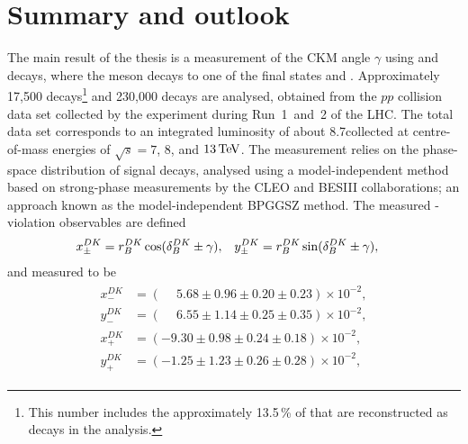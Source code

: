 

\chapter{Summary and outlook}
\label{ch:6-conclusion}

The main result of the thesis is a measurement of the CKM angle $\gamma$ using \BtoDK and \BtoDpi decays, where the \D meson decays to one of the final states \Kspipi and \KsKK. Approximately 17,500 \BtoDK decays\footnote{This number includes the approximately 13.5\,\% of \BtoDK that are reconstructed as \BtoDpi decays in the analysis.} and 230,000 \BtoDpi decays are analysed, obtained from the $pp$ collision data set collected by the \lhcb experiment during Run~1~and~2 of the LHC. The total data set corresponds to an integrated luminosity of about 8.7\invfb collected at centre-of-mass energies of $\sqrt s =7$, $8$, and $13\text{\,Te\kern -0.1em V}$. The measurement relies on the phase-space distribution of signal decays, analysed using a model-independent method based on strong-phase measurements by the CLEO and BESIII collaborations; an approach known as the model-independent BPGGSZ method. The measured \CP-violation observables are defined
\begin{align}
    x_\pm^{{D}{K}} &= r_B^{DK} \cos (\delta_B^{DK} \pm \gamma), & y_\pm^{{D}{K}} &= r_B^{DK} \sin (\delta_B^{DK} \pm \gamma),
\end{align}
and measured to be
\begin{align}
\begin{split}
    x_-^{DK} & = (\phantom{-}5.68 \pm 0.96 \pm  0.20\pm 0.23) \times 10^{-2}, \\
    y_-^{DK} & = (\phantom{-}6.55 \pm 1.14 \pm  0.25\pm 0.35) \times 10^{-2}, \\
    x_+^{DK} & = (         - 9.30 \pm 0.98 \pm  0.24\pm 0.18) \times 10^{-2}, \\
    y_+^{DK} & = (         - 1.25 \pm 1.23 \pm  0.26\pm 0.28) \times 10^{-2},
\end{split}
\end{align}
